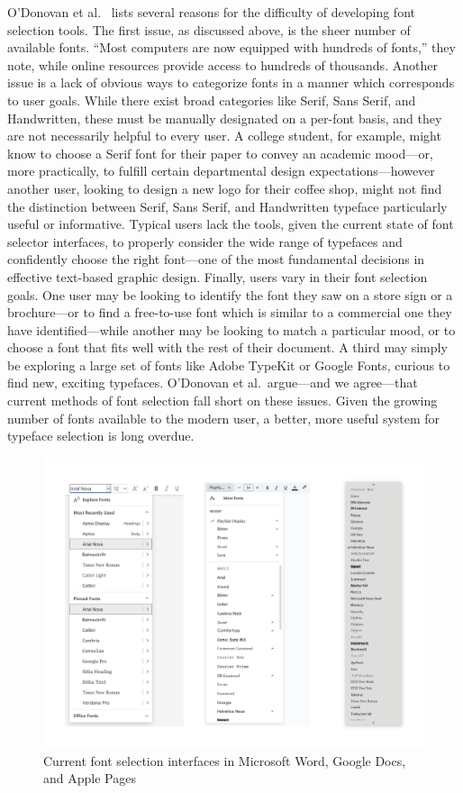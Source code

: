 O'Donovan et al.\ \cite{odonovan2014} lists several reasons for the difficulty of developing font selection tools. The first issue, as discussed above, is the sheer number of available fonts. ``Most computers are now equipped with hundreds of fonts,'' they note, while online resources provide access to hundreds of thousands. Another issue is a lack of obvious ways to categorize fonts in a manner which corresponds to user goals. While there exist broad categories like Serif, Sans Serif, and Handwritten, these must be manually designated on a per-font basis, and they are not necessarily helpful to every user. A college student, for example, might know to choose a Serif font for their paper to convey an academic mood—or, more practically, to fulfill certain departmental design expectations—however another user, looking to design a new logo for their coffee shop, might not find the distinction between Serif, Sans Serif, and Handwritten typeface particularly useful or informative. Typical users lack the tools, given the current state of font selector interfaces, to properly consider the wide range of typefaces and confidently choose the right font—one of the most fundamental decisions in effective text-based graphic design. Finally, users vary in their font selection goals. One user may be looking to identify the font they saw on a store sign or a brochure—or to find a free-to-use font which is similar to a commercial one they have identified---while another may be looking to match a particular mood, or to choose a font that fits well with the rest of their document. A third may simply be exploring a large set of fonts like Adobe TypeKit or Google Fonts, curious to find new, exciting typefaces. O'Donovan et al.\ argue—and we agree—that current methods of font selection fall short on these issues. Given the growing number of fonts available to the modern user, a better, more useful system for typeface selection is long overdue.

\begin{figure}
    \centering
    \includegraphics[width=1\textwidth]{images/font-selectors.png}
    \caption{Current font selection interfaces in Microsoft Word, Google Docs, and Apple Pages}
    \label{fig:font-selectors}
\end{figure}

